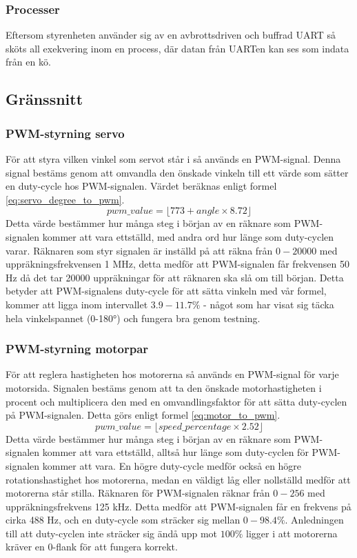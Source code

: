 \documentclass[a4paper,11pt]{article}
\begin{document}
\subsubsection{Processer}
Eftersom styrenheten använder sig av en avbrottsdriven och buffrad UART så sköts all exekvering inom en process, där datan från UARTen kan ses som indata från en kö.

\subsection{Gränssnitt} \label{ssec:controlInterface}

\subsubsection{PWM-styrning servo}
För att styra vilken vinkel som servot står i så används en PWM-signal. Denna signal bestäms genom att omvandla den önskade vinkeln till ett värde som sätter en duty-cycle hos PWM-signalen. Värdet beräknas enligt formel \ref{eq:servo_degree_to_pwm}.
\begin{equation}\label{eq:servo_degree_to_pwm}
pwm\_value =  \lfloor 773 + angle \times 8.72 \rfloor 
\end{equation}
Detta värde bestämmer hur många steg i början av en räknare som PWM-signalen kommer att vara ettställd, med andra ord hur länge som duty-cyclen varar. Räknaren som styr signalen är inställd på att räkna från $0-20000$ med uppräkningsfrekvensen 1 \si{\mega\hertz}, detta medför att PWM-signalen får frekvensen 50 \si{\hertz} då det tar 20000 uppräkningar för att räknaren ska slå om till början. Detta betyder att PWM-signalens duty-cycle för att sätta vinkeln med vår formel, kommer att ligga inom intervallet $3.9-11.7\%$ - något som har visat sig täcka hela vinkelspannet (0-180\si{\degree}) och fungera bra genom testning.


\subsubsection{PWM-styrning motorpar}
För att reglera hastigheten hos motorerna så används en PWM-signal för varje motorsida. Signalen bestäms genom att ta den önskade motorhastigheten i procent och multiplicera den med en omvandlingsfaktor för att sätta duty-cyclen på PWM-signalen. Detta görs enligt formel \ref{eq:motor_to_pwm}.
\begin{equation}\label{eq:motor_to_pwm}
pwm\_value =  \lfloor speed\_percentage \times 2.52 \rfloor 
\end{equation}
Detta värde bestämmer hur många steg i början av en räknare som PWM-signalen kommer att vara ettställd, alltså hur länge som duty-cyclen för PWM-signalen kommer att vara. En högre duty-cycle medför också en högre rotationshastighet hos motorerna, medan en väldigt låg eller nollställd medför att motorerna står stilla.  Räknaren för PWM-signalen räknar från $0-256$ med uppräkningsfrekvens 125 \si{\kilo\hertz}. Detta medför att PWM-signalen får en frekvens på cirka 488 \si{\hertz}, och en duty-cycle som sträcker sig mellan $0-98.4\%$. Anledningen till att duty-cyclen inte sträcker sig ändå upp mot $100\%$ ligger i att motorerna kräver en $0$-flank för att fungera korrekt.
\end{document}
